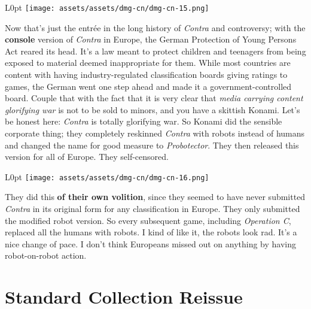 \documentclass{book}
\begin{document}
\begin{wrapfigure}{L}{0pt} \texttt{[image: assets/assets/dmg-cn/dmg-cn-15.png]}\end{wrapfigure}
Now that’s just the entrée in the long history of \emph{Contra} and controversy; with the \textbf{console} version of \emph{Contra} in Europe, the German Protection of Young Persons Act reared its head. It’s a law meant to protect children and teenagers from being exposed to material deemed inappropriate for them. While most countries are content with having industry-regulated classification boards giving ratings to games, the German went one step ahead and made it a government-controlled board. Couple that with the fact that it is very clear that \emph{media carrying content glorifying war} is not to be sold to minors, and you have a skittish Konami. Let’s be honest here: \emph{Contra} is totally glorifying war. So Konami did the sensible corporate thing; they completely reskinned \emph{Contra} with robots instead of humans and changed the name for good measure to \emph{Probotector}. They then released this version for all of Europe. They self-censored.

\begin{wrapfigure}{L}{0pt} \texttt{[image: assets/assets/dmg-cn/dmg-cn-16.png]}\end{wrapfigure}
They did this \textbf{of their own volition}, since they seemed to have never submitted \emph{Contra} in its original form for any classification in Europe. They only submitted the modified robot version. So every subsequent game, including \emph{Operation C}, replaced all the humans with robots. I kind of like it, the robots look rad. It’s a nice change of pace. I don’t think Europeans missed out on anything by having robot-on-robot action.

\FloatBarrier\needspace{5pt}\section*{Standard Collection Reissue}\nopagebreak[4]
\end{document}
